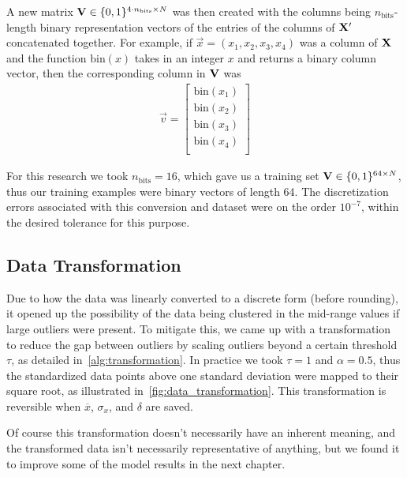 A new matrix \( \mathbf{V} \in \{0,1\}^{4\cdot n_\text{bits} \times N} \) was then created with the columns being \( n_\text{bits} \)-length binary representation vectors of the entries of the columns of \( \mathbf{X}' \) concatenated together.
For example, if \( \vec{x} = (x_1,x_2,x_3,x_4) \) was a column of \( \mathbf{X} \) and the function \( \text{bin}(x) \) takes in an integer \( x \) and returns a binary column vector, then the corresponding column in \( \mathbf{V} \) was
\begin{align}
    \vec{v} = \begin{bmatrix}
        \text{bin}(x_1) \\
        \text{bin}(x_2) \\
        \text{bin}(x_3) \\
        \text{bin}(x_4) \\
    \end{bmatrix}
\end{align}

For this research we took \( n_\text{bits} = 16 \), which gave us a training set \( \mathbf{V} \in \{0,1\}^{64 \times N} \), thus our training examples were binary vectors of length 64.
The discretization errors associated with this conversion and dataset were on the order \( 10^{-7} \), within the desired tolerance for this purpose.

\subsection{Data Transformation}
Due to how the data was linearly converted to a discrete form (before rounding), it opened up the possibility of the data being clustered in the mid-range values if large outliers were present.
To mitigate this, we came up with a transformation to reduce the gap between outliers by scaling outliers beyond a certain threshold \( \tau \), as detailed in~\cref{alg:transformation}.
In practice we took \( \tau = 1 \) and \( \alpha = 0.5 \), thus the standardized data points above one standard deviation were mapped to their square root, as illustrated in~\cref{fig:data_transformation}.
This transformation is reversible when \( \overline{x} \), \( \sigma_x \), and \( \delta \) are saved.

Of course this transformation doesn't necessarily have an inherent meaning, and the transformed data isn't necessarily representative of anything, but we found it to improve some of the model results in the next chapter.

